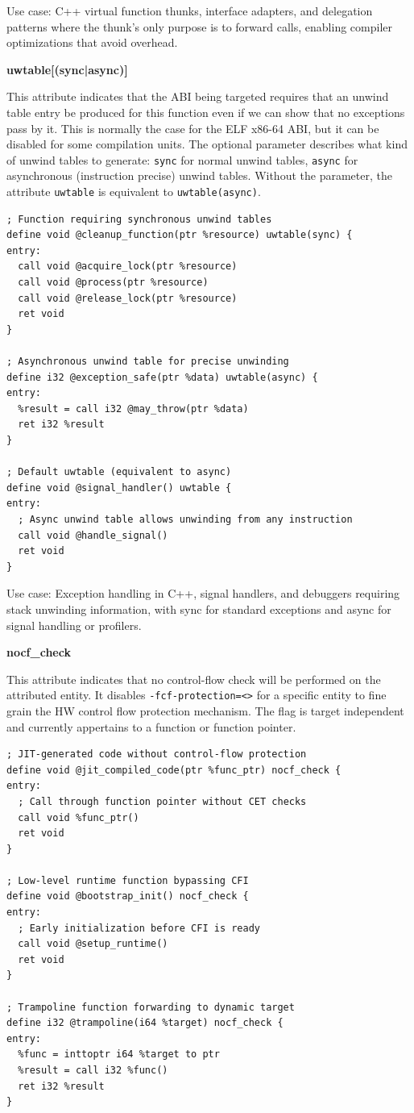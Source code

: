 Use case: C++ virtual function thunks, interface adapters, and delegation patterns where the thunk's only purpose is to forward calls, enabling compiler optimizations that avoid overhead.

\textbf{uwtable[(sync|async)]}

This attribute indicates that the ABI being targeted requires that an unwind table entry be produced for this function even if we can show that no exceptions pass by it.
This is normally the case for the ELF x86-64 ABI, but it can be disabled for some compilation units.
The optional parameter describes what kind of unwind tables to generate: \texttt{sync} for normal unwind tables, \texttt{async} for asynchronous (instruction precise) unwind tables.
Without the parameter, the attribute \texttt{uwtable} is equivalent to \texttt{uwtable(async)}.

\begin{lstlisting}[style=ir]
; Function requiring synchronous unwind tables
define void @cleanup_function(ptr %resource) uwtable(sync) {
entry:
  call void @acquire_lock(ptr %resource)
  call void @process(ptr %resource)
  call void @release_lock(ptr %resource)
  ret void
}

; Asynchronous unwind table for precise unwinding
define i32 @exception_safe(ptr %data) uwtable(async) {
entry:
  %result = call i32 @may_throw(ptr %data)
  ret i32 %result
}

; Default uwtable (equivalent to async)
define void @signal_handler() uwtable {
entry:
  ; Async unwind table allows unwinding from any instruction
  call void @handle_signal()
  ret void
}
\end{lstlisting}

Use case: Exception handling in C++, signal handlers, and debuggers requiring stack unwinding information, with sync for standard exceptions and async for signal handling or profilers.

\textbf{nocf\_check}

This attribute indicates that no control-flow check will be performed on the attributed entity.
It disables \texttt{-fcf-protection=<>} for a specific entity to fine grain the HW control flow protection mechanism.
The flag is target independent and currently appertains to a function or function pointer.

\begin{lstlisting}[style=ir]
; JIT-generated code without control-flow protection
define void @jit_compiled_code(ptr %func_ptr) nocf_check {
entry:
  ; Call through function pointer without CET checks
  call void %func_ptr()
  ret void
}

; Low-level runtime function bypassing CFI
define void @bootstrap_init() nocf_check {
entry:
  ; Early initialization before CFI is ready
  call void @setup_runtime()
  ret void
}

; Trampoline function forwarding to dynamic target
define i32 @trampoline(i64 %target) nocf_check {
entry:
  %func = inttoptr i64 %target to ptr
  %result = call i32 %func()
  ret i32 %result
}
\end{lstlisting}

